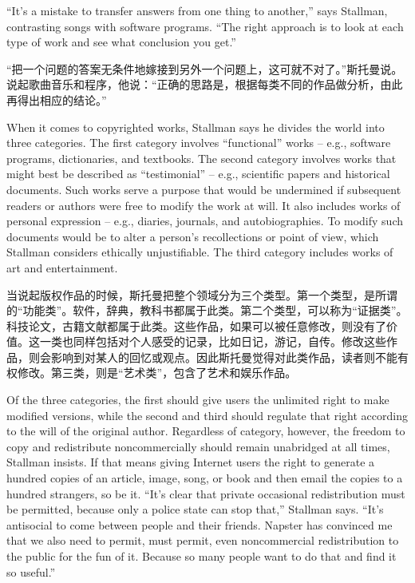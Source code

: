 \ifdefined\eng
``It's a mistake to transfer answers from one thing to another,'' says Stallman, contrasting songs with software programs. ``The right approach is to look at each type of work and see what conclusion you get.''
\fi

\ifdefined\chs
``把一个问题的答案无条件地嫁接到另外一个问题上，这可就不对了。''斯托曼说。说起歌曲音乐和程序，他说：``正确的思路是，根据每类不同的作品做分析，由此再得出相应的结论。''
\fi

\ifdefined\eng
When it comes to copyrighted works, Stallman says he divides the world into three categories. The first category involves ``functional'' works -- e.g., software programs, dictionaries, and textbooks. The second category involves works that might best be described as ``testimonial'' -- e.g., scientific papers and historical documents. Such works serve a purpose that would be undermined if subsequent readers or authors were free to modify the work at will.  It also includes works of personal expression -- e.g., diaries, journals, and autobiographies. To modify such documents would be to alter a person's recollections or point of view, which Stallman considers ethically unjustifiable.  The third category includes works of art and entertainment.
\fi

\ifdefined\chs
当说起版权作品的时候，斯托曼把整个领域分为三个类型。第一个类型，是所谓的``功能类''。软件，辞典，教科书都属于此类。第二个类型，可以称为``证据类''。科技论文，古籍文献都属于此类。这些作品，如果可以被任意修改，则没有了价值。这一类也同样包括对个人感受的记录，比如日记，游记，自传。修改这些作品，则会影响到对某人的回忆或观点。因此斯托曼觉得对此类作品，读者则不能有权修改。第三类，则是``艺术类''，包含了艺术和娱乐作品。
\fi

\ifdefined\eng
Of the three categories, the first should give users the unlimited right to make modified versions, while the second and third should regulate that right according to the will of the original author. Regardless of category, however, the freedom to copy and redistribute noncommercially should remain unabridged at all times, Stallman insists. If that means giving Internet users the right to generate a hundred copies of an article, image, song, or book and then email the copies to a hundred strangers, so be it. ``It's clear that private occasional redistribution must be permitted, because only a police state can stop that,'' Stallman says. ``It's antisocial to come between people and their friends. Napster has convinced me that we also need to permit, must permit, even noncommercial redistribution to the public for the fun of it. Because so many people want to do that and find it so useful.''
\fi

